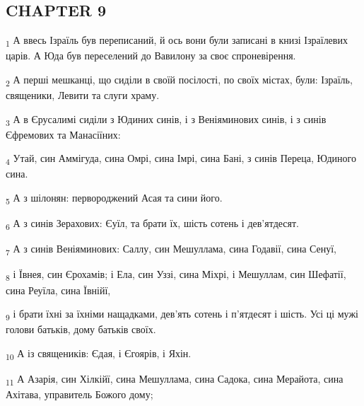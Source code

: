 \subsection{CHAPTER 9}
\begin{tcolorbox}
\textsubscript{1} А ввесь Ізраїль був переписаний, й ось вони були записані в книзі Ізраїлевих царів. А Юда був переселений до Вавилону за своє спроневірення.
\end{tcolorbox}
\begin{tcolorbox}
\textsubscript{2} А перші мешканці, що сиділи в своїй посілості, по своїх містах, були: Ізраїль, священики, Левити та слуги храму.
\end{tcolorbox}
\begin{tcolorbox}
\textsubscript{3} А в Єрусалимі сиділи з Юдиних синів, і з Веніяминових синів, і з синів Єфремових та Манасіїних:
\end{tcolorbox}
\begin{tcolorbox}
\textsubscript{4} Утай, син Аммігуда, сина Омрі, сина Імрі, сина Бані, з синів Переца, Юдиного сина.
\end{tcolorbox}
\begin{tcolorbox}
\textsubscript{5} А з шілонян: первороджений Асая та сини його.
\end{tcolorbox}
\begin{tcolorbox}
\textsubscript{6} А з синів Зерахових: Єуїл, та брати їх, шість сотень і дев'ятдесят.
\end{tcolorbox}
\begin{tcolorbox}
\textsubscript{7} А з синів Веніяминових: Саллу, син Мешуллама, сина Годавії, сина Сенуї,
\end{tcolorbox}
\begin{tcolorbox}
\textsubscript{8} і Ївнея, син Єрохамів; і Ела, син Уззі, сина Міхрі, і Мешуллам, син Шефатії, сина Реуїла, сина Ївнійї,
\end{tcolorbox}
\begin{tcolorbox}
\textsubscript{9} і брати їхні за їхніми нащадками, дев'ять сотень і п'ятдесят і шість. Усі ці мужі голови батьків, дому батьків своїх.
\end{tcolorbox}
\begin{tcolorbox}
\textsubscript{10} А із священиків: Єдая, і Єгоярів, і Яхін.
\end{tcolorbox}
\begin{tcolorbox}
\textsubscript{11} А Азарія, син Хілкійї, сина Мешуллама, сина Садока, сина Мерайота, сина Ахітава, управитель Божого дому;
\end{tcolorbox}

